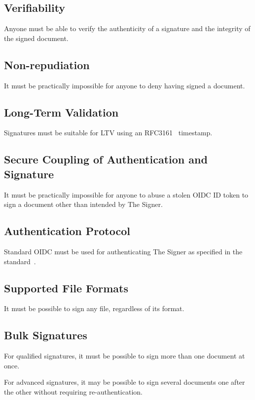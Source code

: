 \subsection{Verifiability}\label{subsec:verifiability}
Anyone must be able to verify the authenticity of a signature and the integrity of the signed document.

\subsection{Non-repudiation}\label{subsec:non-repudiation}
It must be practically impossible for anyone to deny having signed a document.

\subsection{Long-Term Validation}\label{subsec:long-term-validation}
Signatures must be suitable for \gls{LTV} using an RFC3161~\cite{rfc3161} timestamp.

\subsection{Secure Coupling of Authentication and Signature}\label{subsec:secure-coupling-of-authentication-and-signature}
It must be practically impossible for anyone to abuse a stolen \gls{OIDC} ID token to sign a document other than intended by The Signer.

\subsection{Authentication Protocol}\label{subsec:authentication-protocol}
Standard \gls{OIDC} must be used for authenticating The Signer as specified in the standard~\cite{oidc}.

\subsection{Supported File Formats}\label{subsec:supported-file-formats}
It must be possible to sign any file, regardless of its format.

\subsection{Bulk Signatures}\label{subsec:bulk-signatures}
For qualified signatures, it must be possible to sign more than one document at once.

For advanced signatures, it may be possible to sign several documents one after the other without requiring re-authentication.

